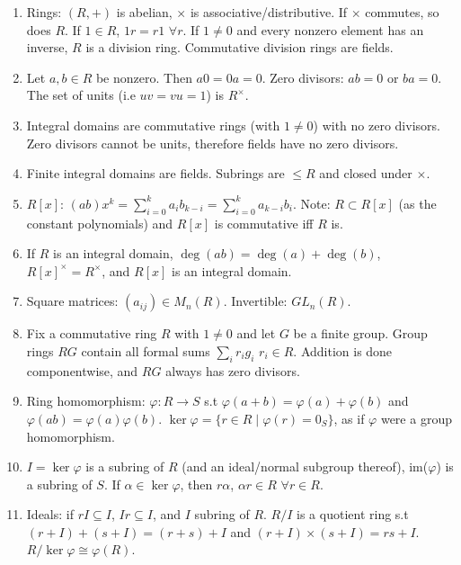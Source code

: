 \documentclass{article}
\begin{document}
\begin{enumerate}[1.]
    \item Rings: $(R, +)$ is abelian, $\times$ is associative/distributive.
        If $\times$ commutes, so does $R$. If $1 \in R$, $1r = r1$ $\forall
        r$. If $1 \not= 0$ and every nonzero element has an inverse, $R$ is
        a division ring. Commutative division rings are fields.
    \item Let $a,b \in R$ be nonzero. Then $a0 = 0a = 0$. Zero divisors:
        $ab = 0$ or $ba = 0$. The set of units (i.e $uv = vu = 1$) is
        $R^{\times}$.
    \item Integral domains are commutative rings (with $1 \not= 0$)
        with no zero divisors. Zero divisors cannot be units, therefore
        fields have no zero divisors.
    \item Finite integral domains are fields. Subrings are $\leq R$ and
        closed under $\times$.
    \item $R[x]$: $(ab)x^k = \sum_{i=0}^k a_ib_{k-i} =
        \sum_{i=0}^k a_{k-i}b_i$. Note: $R \subset R[x]$ (as the constant
        polynomials) and $R[x]$ is commutative iff $R$ is.
    \item If $R$ is an integral domain, $\deg(ab) = \deg(a) + \deg(b)$,
        $R[x]^{\times} = R^{\times}$, and $R[x]$ is an integral domain.
    \item Square matrices: $(a_{ij}) \in M_n(R)$. Invertible: $GL_n(R)$.
    \item Fix a commutative ring $R$ with $1 \not= 0$ and let
        $G$ be a finite group. Group rings $RG$ contain all formal sums
        $\sum_i r_ig_i$ $r_i \in R$. Addition is done componentwise, and
        $RG$ always has zero divisors.
    \item Ring homomorphism: $\varphi : R \rightarrow S$ s.t $\varphi(a + b) =
        \varphi(a) + \varphi(b)$ and $\varphi(ab) = \varphi(a)\varphi(b)$.
        $\ker \varphi = \{r \in R \mid \varphi(r) = 0_S\}$, as if $\varphi$
        were a group homomorphism.
    \item $I = \ker \varphi$ is a subring of $R$ (and an ideal/normal subgroup
        thereof), im($\varphi$) is a subring of $S$.
        If $\alpha \in \ker \varphi$, then $r\alpha$, $\alpha r \in R$
        $\forall r \in R$.
    \item Ideals: if $rI \subseteq I$, $Ir \subseteq I$, and $I$ subring of
        $R$. $R/I$ is a quotient ring s.t $(r+I)+(s+I) = (r+s)+I$ and
        $(r+I)\times(s+I) = rs + I$. $R/\ker \varphi \cong \varphi(R)$.

\end{enumerate}
\end{document}
